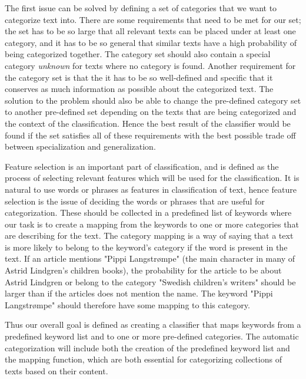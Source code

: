 The first issue can be solved by defining a set of categories that we want to categorize text into. There are some requirements that need to be met for our set; the set has to be so large that all relevant texts can be placed under at least one category, and it has to be so general that similar texts have a high probability of being categorized together. The category set should also contain a special category \textit{unknown} for texts where no category is found. Another requirement for the category set is that the it has to be so well-defined and specific that it conserves as much information as possible about the categorized text. The solution to the problem should also be able to change the pre-defined category set to another pre-defined set depending on the texts that are being categorized and the context of the classification.
Hence the best result of the classifier would be found if the set satisfies all of these requirements with the best possible trade off between specialization and generalization. 

Feature selection is an important part of classification, and is defined as the process of selecting relevant features which will be used for the classification. It is natural to use words or phrases as features in classification of text, hence feature selection is the issue of deciding the words or phrases that are useful for categorization. These should be collected in a predefined list of keywords where our task is to create a mapping from the keywords to one or more categories that are describing for the text. The category mapping is a way of saying that a text is more likely to belong to the keyword's category if the word is present in the text. If an article mentions "Pippi Langstrømpe" (the main character in many of Astrid Lindgren's children books), the probability for the article to be about Astrid Lindgren or belong to the category "Swedish children's writers" should be larger than if the articles does not mention the name. The keyword "Pippi Langstrømpe" should therefore have some mapping to this category. 

Thus our overall goal is defined as creating a classifier that maps keywords from a predefined keyword list and to one or more pre-defined categories. The automatic categorization will include both the creation of the predefined keyword list and the mapping function, which are both essential for categorizing collections of texts based on their content. 

